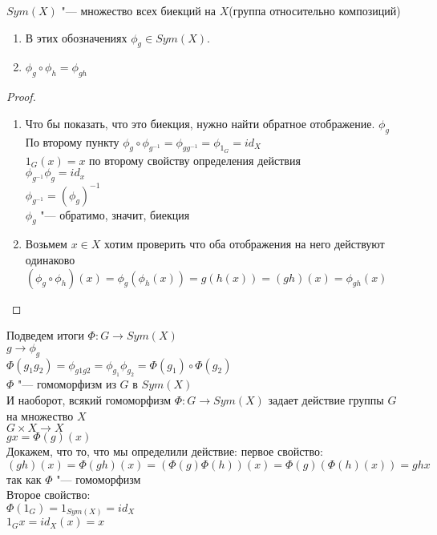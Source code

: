 $Sym(X)$ "--- множество всех биекций на $X$(группа относительно композиций)\\
\begin{lemma}
\begin{enumerate}
\item
В этих обозначениях $\phi_g \in Sym(X)$.
\item
$\phi_g \circ \phi_h = \phi_{gh}$\\
\end{enumerate}
\end{lemma}
\begin{proof}
\begin{enumerate}
     \item
     Что бы показать, что это биекция, нужно найти обратное отображение. 
     $\phi_g$\\
     По второму пункту
     $\phi_g \circ \phi_{g^{-1}} = \phi_{gg^{-1}} = \phi_{1_G} = id_X$\\
     $1_G(x) = x$ по второму свойству определения действия\\
     $\phi_{g^{-1}}\phi_{g} = id_{x}$ \\
     $\phi_{g^{-1}} = (\phi_g)^{-1}$\\
     $\phi_g$ "--- обратимо, значит, биекция\\
     \item
     Возьмем $x \in X$ хотим проверить что оба отображения на него действуют одинаково\\
     $(\phi_g \circ \phi_h)(x) = \phi_g(\phi_h(x)) = g(h(x)) = (gh)(x) = \phi_{gh}(x)$\\
\end{enumerate}
\end{proof}

Подведем итоги
$\Phi \colon G \to Sym(X)$\\
$g \to \phi_g$\\

$\Phi(g_1g_2) = \phi_{g1g2} = \phi_{g_1}\phi_{g_2} = \Phi(g_1) \circ \Phi(g_2)$\\
$\Phi$ "--- гомоморфизм из $G$ в $Sym(X)$\\

И наоборот, всякий гомоморфизм $\Phi \colon G \to Sym(X)$ задает действие группы $G$ на множество $X$\\
$G \times X \to X$\\
$gx = \Phi(g)(x)$\\


Докажем, что то, что мы определили действие:
первое свойство:\\
$(gh)(x) = \Phi(gh)(x) = (\Phi(g)\Phi(h))(x) = \Phi(g)(\Phi(h)(x)) = ghx$\\
так как $\Phi$ "--- гомоморфизм\\ 
Второе свойство:\\
$\Phi(1_G) = 1_{Sym(X)} = id_X$\\
$1_{G}x = id_X(x) = x$


